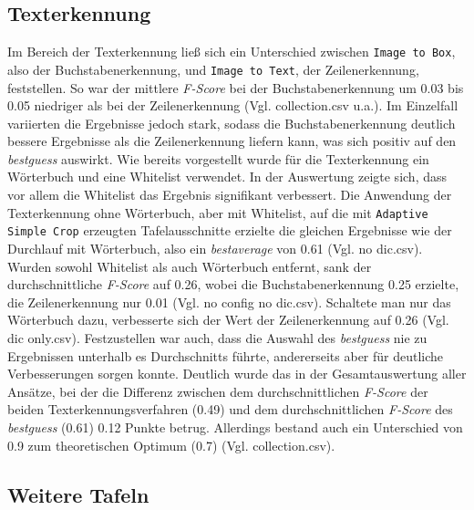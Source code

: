 \subsection{Texterkennung}
Im Bereich der Texterkennung ließ sich ein Unterschied zwischen \verb|Image to Box|, also der Buchstabenerkennung, und \verb|Image to Text|, der Zeilenerkennung, feststellen. So war der mittlere \textit{F-Score} bei der Buchstabenerkennung um 0.03 bis 0.05 niedriger als bei der Zeilenerkennung (Vgl. collection.csv u.a.). Im Einzelfall variierten die Ergebnisse jedoch stark, sodass die Buchstabenerkennung deutlich bessere Ergebnisse als die Zeilenerkennung liefern kann, was sich positiv auf den \textit{bestguess} auswirkt.
Wie bereits vorgestellt wurde für die Texterkennung ein Wörterbuch und eine Whitelist verwendet. In der Auswertung zeigte sich, dass vor allem die Whitelist das Ergebnis signifikant verbessert. Die Anwendung der Texterkennung ohne Wörterbuch, aber mit Whitelist, auf die mit \verb|Adaptive Simple Crop| erzeugten Tafelausschnitte erzielte die gleichen Ergebnisse wie der Durchlauf mit Wörterbuch, also ein \textit{bestaverage} von 0.61 (Vgl. no dic.csv). Wurden sowohl Whitelist als auch Wörterbuch entfernt, sank der durchschnittliche \textit{F-Score} auf 0.26, wobei die Buchstabenerkennung 0.25 erzielte, die Zeilenerkennung nur 0.01 (Vgl. no config no dic.csv). Schaltete man nur das Wörterbuch dazu, verbesserte sich der Wert der Zeilenerkennung auf 0.26 (Vgl. dic only.csv).
Festzustellen war auch, dass die Auswahl des \textit{bestguess} nie zu Ergebnissen unterhalb es Durchschnitts führte, andererseits aber für deutliche Verbesserungen sorgen konnte. Deutlich wurde das in der Gesamtauswertung aller Ansätze, bei der die Differenz zwischen dem durchschnittlichen \textit{F-Score} der beiden Texterkennungsverfahren (0.49) und dem durchschnittlichen \textit{F-Score} des \textit{bestguess} (0.61) 0.12 Punkte betrug. Allerdings bestand auch ein Unterschied von 0.9 zum theoretischen Optimum (0.7) (Vgl. collection.csv).


\subsection{Weitere Tafeln}

